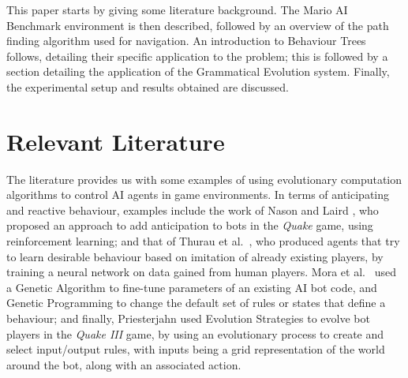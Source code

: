 \documentclass[conference]{IEEEtran}
\begin{document}
This paper starts by giving some literature background. The Mario AI Benchmark
environment is then described, followed by an overview of the path finding
algorithm used for navigation. An introduction to Behaviour Trees follows, detailing
their specific application to the problem; this is followed by a section
detailing the application of the Grammatical Evolution system.
Finally, the experimental setup and results obtained are discussed.

\section{Relevant Literature}

The literature provides us with some examples of using evolutionary
computation algorithms to control AI agents in game environments. In terms 
of anticipating and reactive behaviour, examples include the work of Nason and
Laird \cite{NL04}, who proposed an approach to add anticipation to bots in the
\textit{Quake} game, using reinforcement learning; and that of Thurau et
al.~\cite{TBS04}, who produced agents that try to learn desirable behaviour
based on imitation of already existing players, by training a neural network on data
gained from human players. Mora et al.~\cite{MMM10} used a Genetic Algorithm 
to fine-tune parameters of an existing AI bot code, and Genetic Programming to 
change the default set of rules or states that define a behaviour; and finally, 
Priesterjahn\cite{Pri09} used Evolution Strategies to evolve bot players in the 
\textit{Quake III} game, by using an evolutionary process to create and select 
input/output rules, with inputs being a grid representation of the world 
around the bot, along with an associated action.

\end{document}
